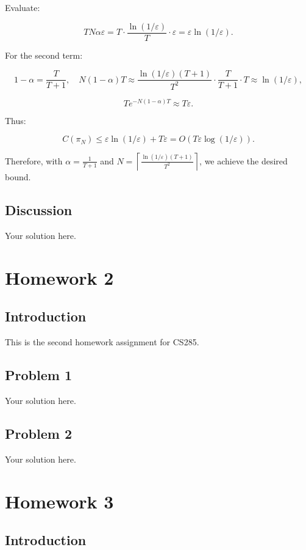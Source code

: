 \documentclass[12pt,oneside]{book}
\begin{document}
Evaluate:

\[
T N \alpha \varepsilon = T \cdot \frac{\ln(1/\varepsilon)}{T} \cdot \varepsilon = \varepsilon \ln(1/\varepsilon).
\]

For the second term:

\[
1 - \alpha = \frac{T}{T + 1}, \quad N (1 - \alpha) T \approx \frac{\ln(1/\varepsilon) (T + 1)}{T^2} \cdot \frac{T}{T + 1} \cdot T \approx \ln(1/\varepsilon),
\]

\[
T e^{-N (1-\alpha)T} \approx T \varepsilon.
\]

Thus:

\[
C(\pi_N) \leq \varepsilon \ln(1/\varepsilon) + T \varepsilon = O(T \varepsilon \log(1/\varepsilon)).
\]

Therefore, with \(\alpha = \frac{1}{T + 1}\) and \(N = \left\lceil \frac{\ln(1/\varepsilon) (T + 1)}{T^2} \right\rceil\), we achieve the desired bound.

\section{Discussion}

Your solution here.

\chapter{Homework 2}

\section{Introduction}

This is the second homework assignment for CS285.

\section{Problem 1}

Your solution here.

\section{Problem 2}

Your solution here.

\chapter{Homework 3}

\section{Introduction}
\end{document}
